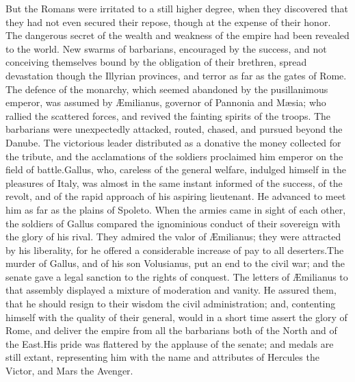 

But the Romans were irritated to a still higher degree, when they
discovered that they had not even secured their repose, though at
the expense of their honor. The dangerous secret of the wealth
and weakness of the empire had been revealed to the world. New
swarms of barbarians, encouraged by the success, and not
conceiving themselves bound by the obligation of their brethren,
spread devastation though the Illyrian provinces, and terror as
far as the gates of Rome. The defence of the monarchy, which
seemed abandoned by the pusillanimous emperor, was assumed by
Æmilianus, governor of Pannonia and Mæsia; who rallied the
scattered forces, and revived the fainting spirits of the troops.
The barbarians were unexpectedly attacked, routed, chased, and
pursued beyond the Danube. The victorious leader distributed as a
donative the money collected for the tribute, and the
acclamations of the soldiers proclaimed him emperor on the field
of battle.\footnotemark[57] Gallus, who, careless of the general welfare,
indulged himself in the pleasures of Italy, was almost in the
same instant informed of the success, of the revolt, and of the
rapid approach of his aspiring lieutenant. He advanced to meet
him as far as the plains of Spoleto. When the armies came in
sight of each other, the soldiers of Gallus compared the
ignominious conduct of their sovereign with the glory of his
rival. They admired the valor of Æmilianus; they were attracted
by his liberality, for he offered a considerable increase of pay
to all deserters.\footnotemark[58] The murder of Gallus, and of his son
Volusianus, put an end to the civil war; and the senate gave a
legal sanction to the rights of conquest. The letters of
Æmilianus to that assembly displayed a mixture of moderation and
vanity. He assured them, that he should resign to their wisdom
the civil administration; and, contenting himself with the
quality of their general, would in a short time assert the glory
of Rome, and deliver the empire from all the barbarians both of
the North and of the East.\footnotemark[59] His pride was flattered by the
applause of the senate; and medals are still extant, representing
him with the name and attributes of Hercules the Victor, and Mars
the Avenger.\footnotemark[60]

